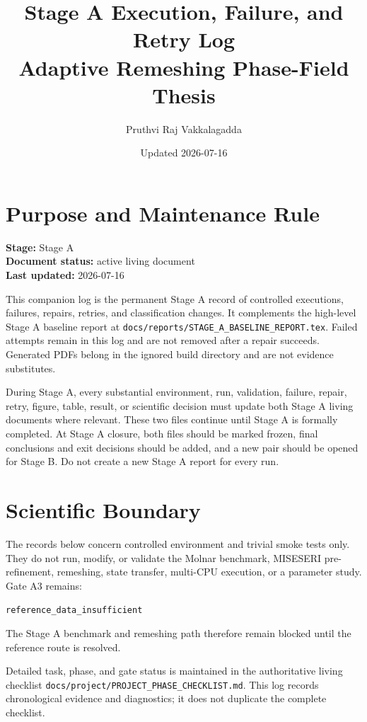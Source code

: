 \documentclass[11pt,a4paper]{article}
\title{Stage A Execution, Failure, and Retry Log\\Adaptive Remeshing Phase-Field Thesis}
\author{Pruthvi Raj Vakkalagadda}
\date{Updated 2026-07-16}
\begin{document}
\maketitle

\section*{Purpose and Maintenance Rule}

\noindent\textbf{Stage:} Stage A\\
\textbf{Document status:} active living document\\
\textbf{Last updated:} 2026-07-16

\medskip

This companion log is the permanent Stage A record of controlled executions, failures, repairs, retries, and classification changes. It complements the high-level Stage A baseline report at \texttt{docs/reports/STAGE\_A\_BASELINE\_REPORT.tex}. Failed attempts remain in this log and are not removed after a repair succeeds. Generated PDFs belong in the ignored build directory and are not evidence substitutes.

During Stage A, every substantial environment, run, validation, failure, repair, retry, figure, table, result, or scientific decision must update both Stage A living documents where relevant. These two files continue until Stage A is formally completed. At Stage A closure, both files should be marked frozen, final conclusions and exit decisions should be added, and a new pair should be opened for Stage B. Do not create a new Stage A report for every run.

\section*{Scientific Boundary}

The records below concern controlled environment and trivial smoke tests only. They do not run, modify, or validate the Molnar benchmark, MISESERI pre-refinement, remeshing, state transfer, multi-CPU execution, or a parameter study. Gate A3 remains:

\begin{center}
\texttt{reference\_data\_insufficient}
\end{center}

The Stage A benchmark and remeshing path therefore remain blocked until the reference route is resolved.

Detailed task, phase, and gate status is maintained in the authoritative living checklist \texttt{docs/project/PROJECT\_PHASE\_CHECKLIST.md}. This log records chronological evidence and diagnostics; it does not duplicate the complete checklist.
\end{document}

